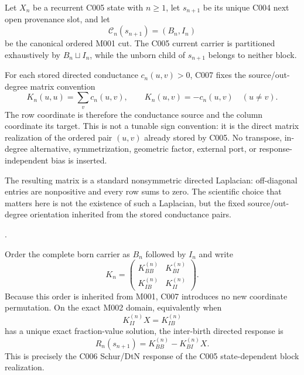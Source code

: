 Let $X_n$ be a recurrent C005 state with $n\geq 1$, let $s_{n+1}$ be its
unique C004 next open provenance slot, and let
\[
  \mathcal C_n(s_{n+1})=(B_n,I_n)
\]
be the canonical ordered M001 cut.  The C005 current carrier is partitioned
exhaustively by $B_n\sqcup I_n$, while the unborn child of $s_{n+1}$ belongs to
neither block.

For each stored directed conductance $c_n(u,v)>0$, C007 fixes the
source/out-degree matrix convention
\[
  K_n(u,u)=\sum_{v}c_n(u,v),
  \qquad
  K_n(u,v)=-c_n(u,v)\quad (u\neq v).
\]
The row coordinate is therefore the conductance source and the column
coordinate its target.  This is not a tunable sign convention: it is the direct
matrix realization of the ordered pair $(u,v)$ already stored by C005.  No
transpose, in-degree alternative, symmetrization, geometric factor, external
port, or response-independent bias is inserted.

The resulting matrix is a standard nonsymmetric directed Laplacian: off-diagonal entries are nonpositive and every row sums to zero.  The scientific choice that matters here is not the existence of such a Laplacian, but the fixed source/out-degree orientation inherited from the stored conductance pairs.

\cite[Abstract and Sec.~1]{AgaevChebotarev2005NonsymmetricLaplacian}.


Order the complete born carrier as $B_n$ followed by $I_n$ and write
\[
  K_n=
  \begin{pmatrix}
    K_{BB}^{(n)} & K_{BI}^{(n)}\\
    K_{IB}^{(n)} & K_{II}^{(n)}
  \end{pmatrix}.
\]
Because this order is inherited from M001, C007 introduces no new coordinate
permutation.  On the exact M002 domain, equivalently when
\[
  K_{II}^{(n)}X=K_{IB}^{(n)}
\]
has a unique exact fraction-value solution, the inter-birth directed response is
\[
  \boxed{
  R_n(s_{n+1})
  =K_{BB}^{(n)}-K_{BI}^{(n)}X
  }.
\]
This is precisely the C006 Schur/DtN response of the C005 state-dependent block
realization.

